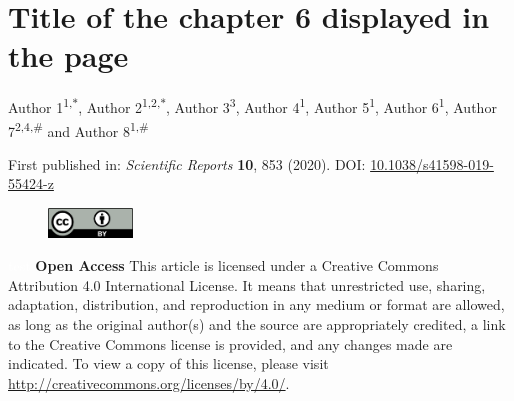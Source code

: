 \chapter[Title of the chapter 6 displayed \\ in the table of contents]
    {Title of the chapter 6 displayed in the page
    }
\label{ch:labelchapter6}

\updatemylof %
\updatemylot %

\regularsection
\headerregularsection

Author 1\textsuperscript{1,\textcolor{sophia}{$\ast$}}, Author 2\textsuperscript{1,2,\textcolor{sophia}{$\ast$}}, Author 3\textsuperscript{3}, Author 4\textsuperscript{1}, Author 5\textsuperscript{1}, Author 6\textsuperscript{1}, Author 7\textsuperscript{2,4,\#} and Author 8\textsuperscript{1,\#} \hfill  \newline

\let\thefootnote\relax{}

\noindent First published in: \textit{Scientific Reports} \textbf{10}, 853 (2020). \hfill \break
DOI: \href{https://doi.org/10.1038/s41598-019-55424-z}{10.1038/s41598-019-55424-z} 

\begin{figure}
    \includegraphics[width=0.2\textwidth]{figures/by.png}
\end{figure} 

\noindent \textcolor{white}{test} \newline \textbf{Open Access} This article is licensed under a Creative Commons Attribution 4.0 International License. It means that unrestricted use, sharing, adaptation, distribution, and reproduction in any medium or format are allowed, as long as the original author(s) and the source are appropriately credited, a link to the Creative Commons license is provided, and any changes made are indicated. To view a copy of this license, please visit \href{http://creativecommons.org/licenses/by/4.0/}{http://creativecommons.org/licenses/by/4.0/}. \newline

